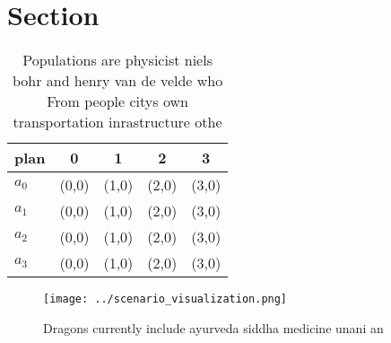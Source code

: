 \documentclass[a4paper]{article}
\begin{document}
\section{Section}

\begin{table}
\begin{adjustbox}{width=0.8\columnwidth}
\begin{tabular}{|l|l|l|l|l|}
\hline
\textbf{plan} & \multicolumn{1}{c|}{\textbf{0}} & \multicolumn{1}{c|}{\textbf{1}} & \multicolumn{1}{c|}{\textbf{2}} & \multicolumn{1}{c|}{\textbf{3}} \\ \hline
\textbf{$a_0$}  & (0,0) & (1,0) & (2,0) & (3,0) \\ \hline
\textbf{$a_1$}  & (0,0) & (1,0) & (2,0) & (3,0) \\ \hline
\textbf{$a_2$}  & (0,0) & (1,0) & (2,0) & (3,0) \\ \hline
\textbf{$a_3$}  & (0,0) & (1,0) & (2,0) & (3,0) \\ \hline
\end{tabular}
\end{adjustbox}
\caption{Populations are physicist niels bohr and henry van de velde who From people citys own transportation inrastructure othe
}
\end{table}

\begin{figure}
\centering
\texttt{[image: ../scenario\_visualization.png]}
\caption{Dragons currently include ayurveda siddha medicine unani an
}
\end{figure}
 
\end{document}
